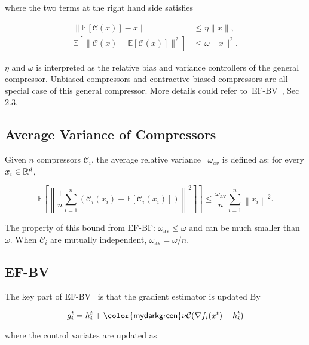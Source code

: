 \documentclass{article} %
\newcommand{\algname}[1]{{\sf\green\relscale{0.90}#1}\xspace}
\newcommand{\sybg}[1]{{\sf\green#1}\xspace}  %
\theoremstyle{plain}
\theoremstyle{definition}
\theoremstyle{remark}
\newcommand{\C}{\mathcal{C}}
\newcommand{\green}{\color{mydarkgreen}}
\newcommand{\kai}[1]{\todo[inline]{{\textbf{Kai:} \emph{#1}}}}
\begin{document}
where the two terms at the right hand side satisfies

\begin{equation}\label{def:compressors}
   \begin{aligned}
      \|\mathbb{E}[\mathcal{C}(x)]-x\| &\leq \eta\|x\|,\\
      \mathbb{E}\left[\|\mathcal{C}(x)-\mathbb{E}[\mathcal{C}(x)]\|^{2}\right] &\leq \omega\|x\|^{2}.
   \end{aligned}
\end{equation}

$\eta$ and $\omega$ is interpreted as the relative bias and variance controllers of the general compressor. Unbiased compressors and contractive biased compressors are all special case of this general compressor. More details could refer to~\algname{EF-BV}~\cite{condat2022ef}, Sec 2.3.

\subsection{Average Variance of Compressors}
Given $n$ compressors $\C_i$, the average relative variance~\cite{condat2022ef} $\omega_{av}$ is defined as: for every $x_i\in \mathbb{R}^d$, 

\begin{equation}
   \left.\mathbb{E}\left[\left\|\frac{1}{n} \sum_{i=1}^{n}\left(\mathcal{C}_{i}\left(x_{i}\right)-\mathbb{E}\left[\mathcal{C}_{i}\left(x_{i}\right)\right]\right)\right\|^{2}\right]\right] \leq \frac{\omega_{\mathrm{av}}}{n} \sum_{i=1}^{n}\left\|x_{i}\right\|^{2}.
   \end{equation}

The property of this bound from \algname{EF-BF}: $\omega_{\mathrm{av}}\leq \omega$ and can be much smaller than $\omega$. When $\C_i$ are mutually independent, $\omega_{\mathrm{av}} = \omega / n$.


\subsection{EF-BV}
The key part of \algname{EF-BV}~\cite{condat2022ef} is that the gradient estimator is updated By

\begin{equation}
   g_i^t = h_i^t + \sybg{\nu} \C(\nabla f_i (x^t) - h_i^t)
\end{equation}

where the control variates are updated as 
\end{document}
